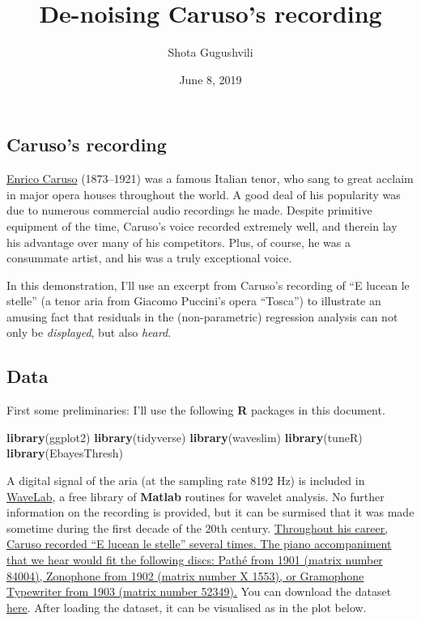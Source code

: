 \documentclass[]{tufte-handout}
\title{De-noising Caruso's recording}
\author{Shota Gugushvili}
\date{June 8, 2019}
\newenvironment{Shaded}{}{}
\newcommand{\KeywordTok}[1]{\textcolor[rgb]{0.00,0.44,0.13}{\textbf{#1}}}
\newcommand{\NormalTok}[1]{#1}
\begin{document}
\maketitle




\subsection{Caruso's recording}\label{carusos-recording}

\href{https://en.wikipedia.org/wiki/Enrico_Caruso}{Enrico Caruso}
(1873--1921) was a famous Italian tenor, who sang to great acclaim in
major opera houses throughout the world. A good deal of his popularity
was due to numerous commercial audio recordings he made. Despite
primitive equipment of the time, Caruso's voice recorded extremely well,
and therein lay his advantage over many of his competitors. Plus, of
course, he was a consummate artist, and his was a truly exceptional
voice.

In this demonstration, I'll use an excerpt from Caruso's recording of
``E lucean le stelle'' (a tenor aria from Giacomo Puccini's opera
``Tosca'') to illustrate an amusing fact that residuals in the
(non-parametric) regression analysis can not only be \emph{displayed},
but also \emph{heard}.

\subsection{Data}\label{data}

First some preliminaries: I'll use the following \textbf{R} packages in
this document.

\begin{Shaded}
\begin{Highlighting}[]
\KeywordTok{library}\NormalTok{(ggplot2)}
\KeywordTok{library}\NormalTok{(tidyverse)}
\KeywordTok{library}\NormalTok{(waveslim)}
\KeywordTok{library}\NormalTok{(tuneR)}
\KeywordTok{library}\NormalTok{(EbayesThresh)}
\end{Highlighting}
\end{Shaded}

A digital signal of the aria (at the sampling rate 8192 Hz) is included
in
\href{http://statweb.stanford.edu/~wavelab/Wavelab_850/index_wavelab850.html}{WaveLab},
a free library of \textbf{Matlab} routines for wavelet analysis. No
further information on the recording is provided, but it can be surmised
that it was made sometime during the first decade of the 20th century.
\href{margin}{Throughout his career, Caruso recorded ``E lucean le
stelle'' several times. The piano accompaniment that we hear would fit
the following discs: Pathé from 1901 (matrix number 84004), Zonophone
from 1902 (matrix number X 1553), or Gramophone Typewriter from 1903
(matrix number 52349).} You can download the dataset
\href{caruso.txt}{here}. After loading the dataset, it can be visualised
as in the plot below.
\end{document}
